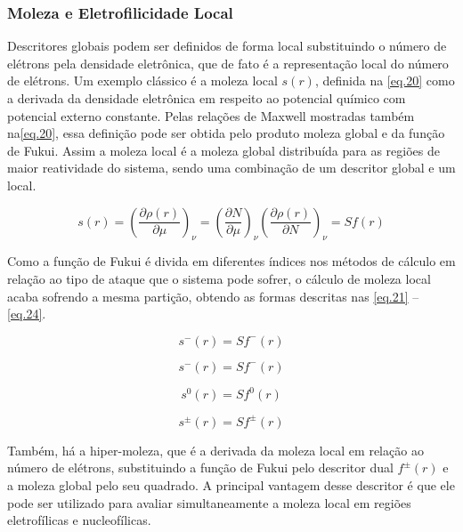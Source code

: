 \documentclass[a4paper,11pt]{refart}
\begin{document}
\subsubsection{Moleza e Eletrofilicidade Local}

Descritores globais podem ser definidos de forma local substituindo o número de elétrons pela densidade eletrônica, que de fato é a representação local do número de elétrons. Um exemplo clássico é a moleza local $s(r)$, definida na \autoref{eq.20} como a derivada da densidade eletrônica em respeito ao potencial químico com potencial externo constante. Pelas relações de Maxwell mostradas também na\autoref{eq.20}, essa definição pode ser obtida pelo produto moleza global e da função de Fukui. Assim a moleza local é a moleza global distribuída para as regiões de maior reatividade do sistema, sendo uma combinação de um descritor global e um local\cite{Lee1988}. 


\begin{equation}
s(r)= \left(\frac{\partial \rho(r)}{\partial \mu} \right)_\nu =
\left(\frac{\partial N}{\partial \mu}\right)_\nu
\left(\frac{\partial \rho(r)}{\partial N} \right)_\nu = Sf(r)
\label{eq.20}
\end{equation}

Como a função de Fukui é divida em diferentes índices nos métodos de cálculo em relação ao tipo de ataque que o sistema pode sofrer, o cálculo de moleza local acaba sofrendo a mesma partição, obtendo as formas descritas nas \autoref{eq.21} -- \autoref{eq.24}. 

\begin{equation}
s^-(r) = Sf^-(r)
\label{eq.21}
\end{equation}

\begin{equation}
s^-(r) = Sf^-(r)
\label{eq.22}
\end{equation}

\begin{equation}
s^{0}(r) = Sf^{0}(r)
\label{eq.23}
\end{equation}

\begin{equation}
s^{\pm}(r) = Sf^{\pm}(r)
\label{eq.24}
\end{equation}

Também, há a hiper-moleza, que é a derivada da moleza local em relação ao número de elétrons, substituindo a função de Fukui pelo descritor dual $f^{\pm}(r)$ e a moleza global pelo seu quadrado\cite{sandoval2018theoretical}. A principal vantagem desse descritor é que ele pode ser utilizado para avaliar simultaneamente a moleza local em regiões eletrofílicas e nucleofílicas. 
\end{document}
